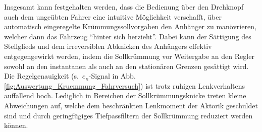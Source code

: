 Insgesamt kann festgehalten werden, dass die Bedienung über den Drehknopf auch dem ungeübten Fahrer eine intuitive Möglichkeit verschafft, über automatisch eingeregelte Krümmungssollvorgaben den Anhänger zu manövrieren, welcher dann das Fahrzeug "`hinter sich herzieht"'.
Dabei kann der Sättigung des Stellglieds und dem irreversiblen Abknicken des Anhängers effektiv entgegengewirkt werden, indem die Sollkrümmung vor Weitergabe an den Regler sowohl an den instantanen als auch an den stationären Grenzen gesättigt wird. Die Regelgenauigkeit (s.\ $e_\kappa$-Signal in Abb.\,\ref{fig:Auswertung_Kruemmung_Fahrversuch}) ist trotz ruhigen Lenkverhaltens auffallend hoch. Lediglich in Bereichen der Sollkrümmungsknicke treten kleine Abweichungen auf, welche dem beschränkten Lenkmoment der Aktorik geschuldet sind und durch geringfügiges Tiefpassfiltern der Sollkrümmung reduziert werden können.



